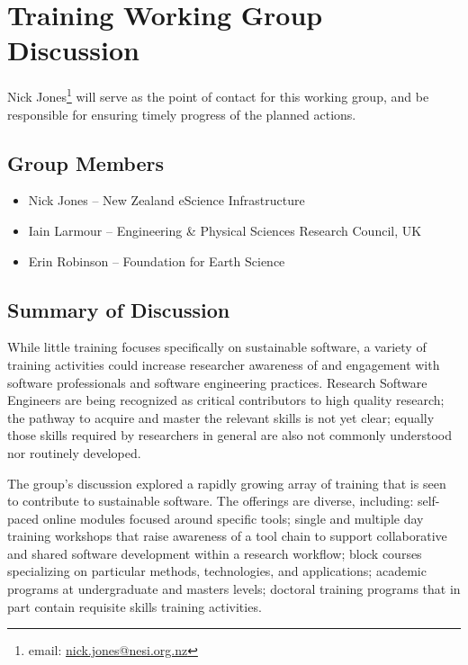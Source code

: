 \section{Training Working Group Discussion}
\label{sec:appendix_training}

Nick Jones\footnote{email:
\href{mailto:nick.jones@nesi.org.nz}{nick.jones@nesi.org.nz}} will serve as the
point of contact for this working group, and be responsible for ensuring timely
progress of the planned actions.

\subsection{Group Members}
\begin{itemize}
\item Nick Jones -- New Zealand eScience Infrastructure
\item Iain Larmour -- Engineering \& Physical Sciences Research Council, UK
\item Erin Robinson -- Foundation for Earth Science
\end{itemize}

\subsection{Summary of Discussion}


While little training focuses specifically on sustainable
software, a variety of training activities could increase researcher awareness of
and engagement with software professionals and software engineering practices.
Research Software Engineers are being recognized as critical contributors to
high quality research; the pathway to acquire and master the relevant skills
is not yet clear; equally those skills required by researchers in general are
also not commonly understood nor routinely developed.

The group's discussion explored a rapidly growing array of training that is seen
to contribute to sustainable software. The offerings are diverse, including:
self-paced online modules focused around specific tools; single and multiple day
training workshops that raise awareness of a tool chain to support collaborative
and shared software development within a research workflow; block courses
specializing on particular methods, technologies, and applications; academic
programs at undergraduate and masters levels; doctoral training programs that in
part contain requisite skills training activities.

